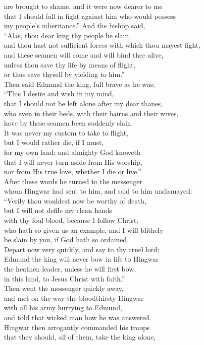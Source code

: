 \documentclass[10pt]{book}
\begin{document}
\begin{center}
\parbox{\pagelen}{
are brought to shame, and it were now dearer to me \\
that I should fall in fight against him who would possess \\
my people's inheritance.'' And the bishop said, \\
``Alas, thou dear king thy people lie slain,  \\
and thou hast not sufficient forces with which thou mayest fight, \\
and these seamen will come and will bind thee alive, \\
unless thou save thy life by means of flight, \\
or thus save thyself by yielding to him.'' \\
Then said Edmund the king, full brave as he was; \\
``This I desire and wish in my mind, \\
that I should not be left alone after my dear thanes, \\
who even in their beds, with their bairns and their wives, \\
have by these seamen been suddenly slain. \\
It was never my custom to take to flight,  \\
but I would rather die, if I must, \\
for my own land; and almighty God knoweth \\
that I will never turn aside from His worship, \\
nor from His true love, whether I die or live.'' \\
After these words he turned to the messenger \\
whom Hingwar had sent to him, and said to him undismayed: \\
``Verily thou wouldest now be worthy of death, \\
but I will not defile my clean hands \\
with thy foul blood, because I follow Christ, \\
who hath so given us an example, and I will blithely \\
be slain by you, if God hath so ordained. \\
Depart now very quickly, and say to thy cruel lord; \\
Edmund the king will never bow in life to Hingwar \\
the heathen leader, unless he will first bow,  \\
in this land, to Jesus Christ with faith.'' \\
Then went the messenger quickly away, \\
and met on the way the bloodthirsty Hingwar \\
with all his army hurrying to Edmund, \\
and told that wicked man how he was answered. \\
Hingwar then arrogantly commanded his troops \\
that they should, all of them, take the king alone, \\
}
\end{center}
\end{document}
